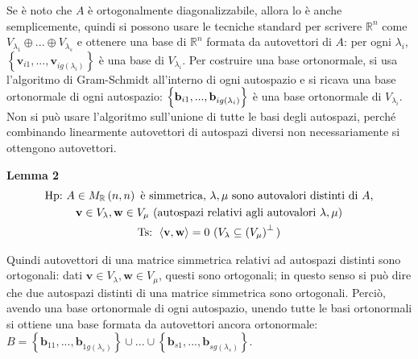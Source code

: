 \documentclass{article}
\begin{document}
Se \`{e} noto che $A$ \`{e} ortogonalmente diagonalizzabile, allora lo \`{e}
anche semplicemente, quindi si possono usare le tecniche standard per
scrivere $%
\mathbb{R}
^{n}$ come $V_{\lambda _{1}}\oplus ...\oplus V_{\lambda _{s}}$ e ottenere
una base di $%
\mathbb{R}
^{n}$ formata da autovettori di $A$: per ogni $\lambda _{i}$, $\left\{ 
\mathbf{v}_{i1}\mathbf{,...,v}_{ig\left( \lambda _{i}\right) }\right\} $ 
\`{e} una base di $V_{\lambda _{i}}$. Per costruire una base ortonormale, si
usa l'algoritmo di Gram-Schmidt all'interno di ogni autospazio e si ricava
una base ortonormale di ogni autospazio: $\left\{ \mathbf{b}_{i1}\mathbf{%
,...,b}_{ig\left( \lambda _{i}\right) }\right\} $ \`{e} una base ortonormale
di $V_{\lambda _{i}}$. Non si pu\`{o} usare l'algoritmo sull'unione di tutte
le basi degli autospazi, perch\'{e} combinando linearmente autovettori di
autospazi diversi non necessariamente si ottengono autovettori.

\textbf{Lemma 2}%
\begin{gather*}
\text{Hp}\text{:}\text{ }A\in M_{%
\mathbb{R}
}\left( n,n\right) \text{ \`{e} simmetrica, }\lambda ,\mu \text{ sono
autovalori distinti di }A\text{,} \\
\mathbf{v}\in V_{\lambda },\mathbf{w}\in V_{\mu }\text{ (autospazi relativi
agli autovalori }\lambda ,\mu \text{)} \\
\text{Ts}\text{: }\left\langle \mathbf{v,w}\right\rangle =0\text{ (}%
V_{\lambda }\subseteq \left( V_{\mu }\right) ^{\perp }\text{)}
\end{gather*}

Quindi autovettori di una matrice simmetrica relativi ad autospazi distinti
sono ortogonali: dati $\mathbf{v}\in V_{\lambda },\mathbf{w}\in V_{\mu }$,
questi sono ortogonali; in questo senso si pu\`{o} dire che due autospazi
distinti di una matrice simmetrica sono ortogonali. Perci\`{o}, avendo una
base ortonormale di ogni autospazio, unendo tutte le basi ortonormali si
ottiene una base formata da autovettori ancora ortonormale: $B=\left\{ 
\mathbf{b}_{11}\mathbf{,...,b}_{1g\left( \lambda _{s}\right) }\right\} \cup
...\cup \left\{ \mathbf{b}_{s1}\mathbf{,...,b}_{sg\left( \lambda _{s}\right)
}\right\} $.
\end{document}

